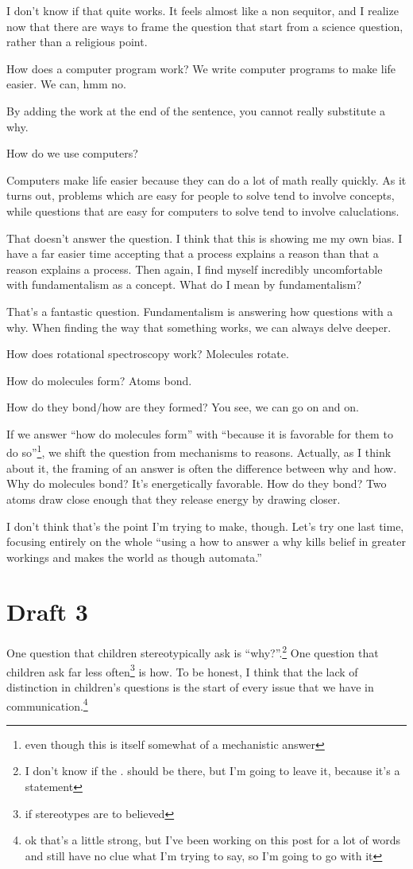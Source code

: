 \documentclass[12pt]{article}[titlepage]
\newcommand{\say}[1]{``#1''}
\renewcommand{\,}{\textsuperscript{,}}
\begin{document}
I don't know if that quite works.
It feels almost like a non sequitor, and I realize now that there are ways to frame the question that start from a science question, rather than a religious point.

How does a computer program work?
We write computer programs to make life easier.
We can, hmm no.

By adding the work at the end of the sentence, you cannot really substitute a why.

How do we use computers?

Computers make life easier because they can do a lot of math really quickly.
As it turns out, problems which are easy for people to solve tend to involve concepts, while questions that are easy for computers to solve tend to involve caluclations.

That doesn't answer the question.
I think that this is showing me my own bias.
I have a far easier time accepting that a process explains a reason than that a reason explains a process.
Then again, I find myself incredibly uncomfortable with fundamentalism as a concept.
What do I mean by fundamentalism?

That's a fantastic question.
Fundamentalism is answering how questions with a why.
When finding the way that something works, we can always delve deeper.

How does rotational spectroscopy work?
Molecules rotate.

How do molecules form?
Atoms bond.

How do they bond/how are they formed?
You see, we can go on and on.

If we answer \say{how do molecules form} with \say{because it is favorable for them to do so}\footnote{even though this is itself somewhat of a mechanistic answer}, we shift the question from mechanisms to reasons.
Actually, as I think about it, the framing of an answer is often the difference between why and how.
Why do molecules bond? It's energetically favorable.
How do they bond? Two atoms draw close enough that they release energy by drawing closer.

I don't think that's the point I'm trying to make, though.
Let's try one last time, focusing entirely on the whole \say{using a how to answer a why kills belief in greater workings and makes the world as though automata.}

\section{Draft 3}
One question that children stereotypically ask is \say{why?}.\footnote{I don't know if the . should be there, but I'm going to leave it, because it's a statement}
One question that children ask far less often\footnote{if stereotypes are to believed} is how.
To be honest, I think that the lack of distinction in children's questions is the start of every issue that we have in communication.\footnote{ok that's a little strong, but I've been working on this post for a lot of words and still have no clue what I'm trying to say, so I'm going to go with it}
\end{document}
